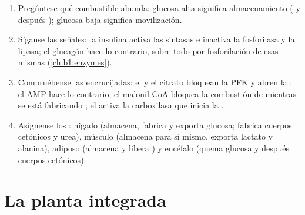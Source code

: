 \begin{method}\label{met:b1:biosyntheses-integration:state}
\begin{enumerate}
  \item Pregúntese qué combustible abunda: glucosa alta significa
        almacenamiento ( y después ); glucosa baja significa
        movilización.
  \item Síganse las señales: la insulina activa las sintasas e inactiva la
        fosforilasa y la lipasa; el glucagón hace lo contrario, sobre todo
        por fosforilación de esas mismas  (\cref{ch:b1:enzymes}).
  \item Compruébense las encrucijadas: el  y el citrato bloquean la PFK
        y abren la ; el AMP hace lo contrario; el
        malonil-CoA bloquea la combustión de  mientras se está
        fabricando ; el  activa la carboxilasa que inicia la
        .
  \item Asígnense los : hígado (almacena, fabrica y exporta glucosa;
        fabrica cuerpos cetónicos y urea), músculo (almacena  para
        sí mismo, exporta lactato y alanina),  adiposo (almacena y
        libera ) y encéfalo (quema glucosa y después cuerpos
        cetónicos).
\end{enumerate}
\end{method}

\section{La planta integrada}


